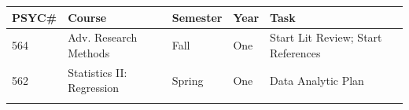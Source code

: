 \documentclass[openany]{book}
\begin{document}
\begin{longtable}[]{@{}lllll@{}}
\toprule
\begin{minipage}[b]{0.03\columnwidth}\raggedright
PSYC\#\strut
\end{minipage} & \begin{minipage}[b]{0.27\columnwidth}\raggedright
Course\strut
\end{minipage} & \begin{minipage}[b]{0.26\columnwidth}\raggedright
Semester\strut
\end{minipage} & \begin{minipage}[b]{0.10\columnwidth}\raggedright
Year\strut
\end{minipage} & \begin{minipage}[b]{0.19\columnwidth}\raggedright
Task\strut
\end{minipage}\tabularnewline
\midrule
\endhead
\begin{minipage}[t]{0.03\columnwidth}\raggedright
564\strut
\end{minipage} & \begin{minipage}[t]{0.27\columnwidth}\raggedright
Adv. Research Methods\strut
\end{minipage} & \begin{minipage}[t]{0.26\columnwidth}\raggedright
Fall\strut
\end{minipage} & \begin{minipage}[t]{0.10\columnwidth}\raggedright
One\strut
\end{minipage} & \begin{minipage}[t]{0.19\columnwidth}\raggedright
Start Lit Review; Start References\strut
\end{minipage}\tabularnewline
\begin{minipage}[t]{0.03\columnwidth}\raggedright
562\strut
\end{minipage} & \begin{minipage}[t]{0.27\columnwidth}\raggedright
Statistics II: Regression\strut
\end{minipage} & \begin{minipage}[t]{0.26\columnwidth}\raggedright
Spring\strut
\end{minipage} & \begin{minipage}[t]{0.10\columnwidth}\raggedright
One\strut
\end{minipage} & \begin{minipage}[t]{0.19\columnwidth}\raggedright
Data Analytic Plan\strut
\end{minipage}\tabularnewline
\begin{minipage}[t]{0.03\columnwidth}\raggedright

\end{minipage}
\end{longtable}
\end{document}
